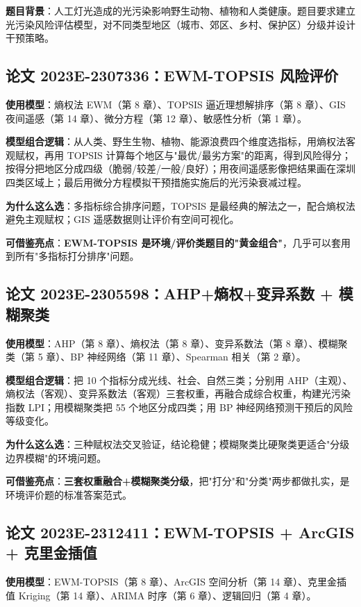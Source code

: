 \textbf{题目背景}：人工灯光造成的光污染影响野生动物、植物和人类健康。题目要求建立光污染风险评估模型，对不同类型地区（城市、郊区、乡村、保护区）分级并设计干预策略。

\subsection{论文 2023E-2307336：EWM-TOPSIS 风险评价}
\textbf{使用模型}：熵权法 EWM（第 8 章）、TOPSIS 逼近理想解排序（第 8 章）、GIS 夜间遥感（第 14 章）、微分方程（第 12 章）、敏感性分析（第 1 章）。

\textbf{模型组合逻辑}：从人类、野生生物、植物、能源浪费四个维度选指标，用熵权法客观赋权，再用 TOPSIS 计算每个地区与"最优/最劣方案"的距离，得到风险得分；按得分把地区分成四级（脆弱/较差/一般/良好）；用夜间遥感影像把结果画在深圳四类区域上；最后用微分方程模拟干预措施实施后的光污染衰减过程。

\textbf{为什么这么选}：多指标综合排序问题，TOPSIS 是最经典的解法之一，配合熵权法避免主观赋权；GIS 遥感数据则让评价有空间可视化。

\textbf{可借鉴亮点}：\textbf{EWM-TOPSIS 是环境/评价类题目的"黄金组合"}，几乎可以套用到所有"多指标打分排序"问题。

\subsection{论文 2023E-2305598：AHP+熵权+变异系数 + 模糊聚类}
\textbf{使用模型}：AHP（第 8 章）、熵权法（第 8 章）、变异系数法（第 8 章）、模糊聚类（第 5 章）、BP 神经网络（第 11 章）、Spearman 相关（第 2 章）。

\textbf{模型组合逻辑}：把 10 个指标分成光线、社会、自然三类；分别用 AHP（主观）、熵权法（客观）、变异系数法（客观）三套权重，再融合成综合权重，构建光污染指数 LPI；用模糊聚类把 55 个地区分成四类；用 BP 神经网络预测干预后的风险等级变化。

\textbf{为什么这么选}：三种赋权法交叉验证，结论稳健；模糊聚类比硬聚类更适合"分级边界模糊"的环境问题。

\textbf{可借鉴亮点}：\textbf{三套权重融合+模糊聚类分级}，把"打分"和"分类"两步都做扎实，是环境评价题的标准答案范式。

\subsection{论文 2023E-2312411：EWM-TOPSIS + ArcGIS + 克里金插值}
\textbf{使用模型}：EWM-TOPSIS（第 8 章）、ArcGIS 空间分析（第 14 章）、克里金插值 Kriging（第 14 章）、ARIMA 时序（第 6 章）、逻辑回归（第 4 章）。

